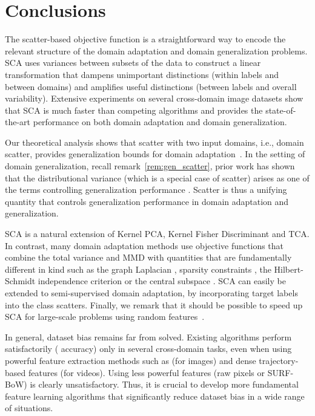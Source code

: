 \documentclass[10pt,journal,compsoc]{IEEEtran}
\begin{document}
\vspace{-1em}
\section{Conclusions}
\label{sec:conc}
The scatter-based objective function is a straightforward way to encode the relevant structure of the domain adaptation and domain generalization problems. 
SCA uses variances between subsets of the data to construct a linear transformation that dampens unimportant distinctions (within labels and between domains) and amplifies useful distinctions (between labels and overall variability). 
Extensive experiments on several cross-domain image datasets show that SCA is much faster than competing algorithms and provides the state-of-the-art performance on both domain adaptation and domain generalization.

Our theoretical analysis shows that scatter with two input domains, i.e., domain scatter, provides generalization bounds for domain adaptation~\cite{Mansour2009}. In the setting of domain generalization, recall remark~\ref{rem:gen_scatter}, prior work has shown that the distributional variance (which is a special case of scatter) arises as one of the terms controlling generalization performance \cite{Muandet2013}. Scatter is thus a unifying quantity that controls generalization performance in domain adaptation and generalization.

SCA is a natural extension of Kernel PCA, Kernel Fisher Discriminant and TCA. 
In contrast, many domain adaptation methods use objective functions that combine the total variance and MMD with quantities that are fundamentally different in kind such as the graph Laplacian \cite{Long:2013aa}, sparsity constraints \cite{Long:2013aa,Long2014a}, the Hilbert-Schmidt independence criterion \cite{Pan2011} or the central subspace \cite{Muandet2013}. SCA can easily be extended to semi-supervised domain adaptation, by incorporating target labels into the class scatters. 
Finally, we remark that it should be possible to speed up SCA for large-scale problems using random features~\cite{Rahimi:07}. 




In general, dataset bias remains far from solved. 
Existing algorithms perform satisfactorily ( accuracy) only in several cross-domain tasks, even when using powerful feature extraction methods such as  (for images) and dense trajectory-based features (for videos).
Using less powerful features (raw pixels or SURF-BoW) is clearly unsatisfactory.
Thus, it is crucial to develop more fundamental feature learning algorithms that significantly reduce dataset bias in a wide range of situations.
\end{document}
